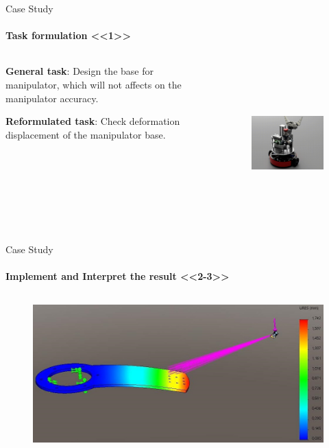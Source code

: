 \documentclass[aspectratio=169]{beamer}
\begin{document}
\begin{frame}[t]{Case Study}
\framesubtitle{Task formulation <<1>>}
    \begin{columns}[T,onlytextwidth]
        \begin{column}{0.49\textwidth}
            \textbf{General task}: Design the base for manipulator, which will not affects on the manipulator accuracy.
            \medskip

            \textbf{Reformulated task}: Check deformation displacement of the manipulator base.
        \end{column}
        \begin{column}{0.49\textwidth}
            \vspace{-0.6cm}
            \begin{figure}[H]
                \href{https://gifyu.com/image/S7HqU}{
                    \centering\includegraphics[height=6cm,width=1\textwidth,keepaspectratio]{eurobot_robot_pic.png}}
                \label{fig:eurobot_robot_pic.png}
            \end{figure}
        \end{column}
    \end{columns}
\end{frame}



\begin{frame}[t]{Case Study}
\framesubtitle{Implement and Interpret the result <<2-3>>}
    \vspace{-0.6cm}
    \begin{figure}[H]
        \centering\includegraphics[height=6cm,width=1\textwidth,keepaspectratio]{cae_ex4.jpg}
        \label{fig:cae_ex4.jpg}
    \end{figure}
\end{frame}
\end{document}
